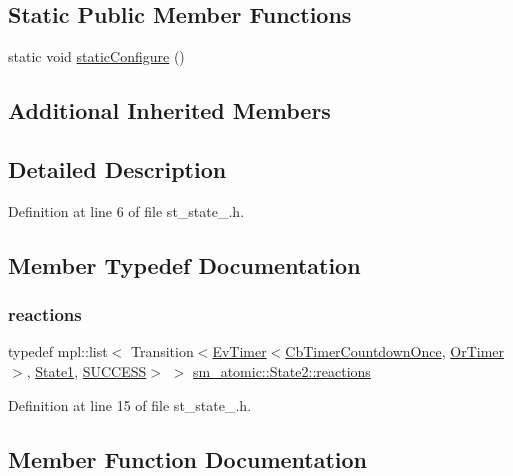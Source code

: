 \subsection*{Static Public Member Functions}
\begin{DoxyCompactItemize}
\item 
static void \hyperlink{structsm__atomic_1_1State2_ab6cafa3e8433c2d7ee10fa6fec8f3748}{static\+Configure} ()
\end{DoxyCompactItemize}
\subsection*{Additional Inherited Members}


\subsection{Detailed Description}


Definition at line 6 of file st\+\_\+state\+\_.\+h.



\subsection{Member Typedef Documentation}
\mbox{\label{structsm__atomic_1_1State2_a9436556de6be8ea64fd35707aa4bfec8}} 
\subsubsection{\texorpdfstring{reactions}{reactions}}
{\footnotesize\ttfamily typedef mpl\+::list$<$ Transition$<$\hyperlink{structcl__ros__timer_1_1EvTimer}{Ev\+Timer}$<$\hyperlink{classcl__ros__timer_1_1CbTimerCountdownOnce}{Cb\+Timer\+Countdown\+Once}, \hyperlink{classsm__atomic_1_1OrTimer}{Or\+Timer}$>$, \hyperlink{structsm__atomic_1_1State1}{State1}, \hyperlink{structsmacc_1_1default__transition__tags_1_1SUCCESS}{S\+U\+C\+C\+E\+SS}$>$ $>$ \hyperlink{structsm__atomic_1_1State2_a9436556de6be8ea64fd35707aa4bfec8}{sm\+\_\+atomic\+::\+State2\+::reactions}}



Definition at line 15 of file st\+\_\+state\+\_.\+h.



\subsection{Member Function Documentation}
\mbox{\label{structsm__atomic_1_1State2_a871fb6c688a61bb4902ea6d44f51025c}} 
